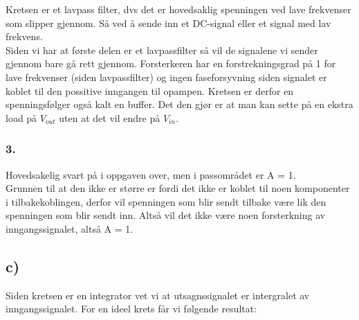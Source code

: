 \documentclass[a4paper, norsk, twoside, 10pt]{article}
\begin{document}
Kretsen er et lavpass filter, dvs det er hovedsaklig spenningen ved lave frekvenser som slipper gjennom. Så ved å sende inn et DC-signal eller et signal med lav frekvens. \\
Siden vi har at første delen er et lavpassfilter så vil de signalene vi sender gjennom bare gå rett gjennom. Forsterkeren har en forstrekningsgrad på 1 for lave frekvenser (siden lavpassfilter) og ingen faseforsyvning siden signalet er koblet til den possitive inngangen til opampen. Kretsen er derfor en spenningsfølger også kalt en buffer. Det den gjør er at man kan sette på en ekstra load på $V_{out}$ uten at det vil endre på $V_{in}$.



\subsubsection*{3.}
Hovedsakelig svart på i oppgaven over, men i passområdet er A = 1. \\
Grunnen til at den ikke er større er fordi det ikke er koblet til noen komponenter i tilbakekoblingen, derfor vil spenningen som blir sendt tilbake være lik den spenningen som blir sendt inn. Altså vil det ikke være noen forsterkning av inngangssignalet, altså A = 1.




\subsection*{c)}
Siden kretsen er en integrator vet vi at utsagnssignalet er intergralet av inngangssignalet. For en ideel krets får vi følgende resultat:\\

\end{document}
